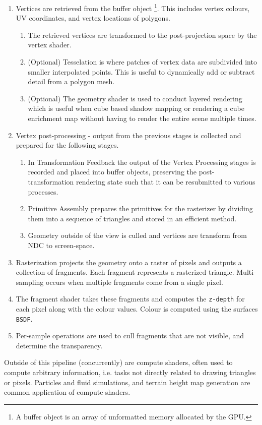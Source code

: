 \documentclass[11pt]{article}
\begin{document}
\begin{enumerate}
\item Vertices are retrieved from the buffer object \footnote{A buffer object is an array of unformatted memory allocated by the GPU.}. This includes vertex
colours, UV coordinates, and vertex locations of polygons.
\begin{enumerate}
\item The retrieved vertices are transformed to the post-projection space by the
vertex shader.
\item (Optional) Tesselation is where patches of vertex data are subdivided into
smaller interpolated points. This is useful to dynamically add or subtract
detail from a polygon mesh.
\item (Optional) The geometry shader is used to conduct layered rendering which is
useful when cube based shadow mapping or rendering a cube enrichment map
without having to render the entire scene multiple times.
\end{enumerate}
\item Vertex post-processing - output from the previous stages is collected
and prepared for the following stages.
\begin{enumerate}
\item In Transformation Feedback the output of the Vertex Processing stages is
recorded and placed into buffer objects, preserving the post-transformation
rendering state such that it can be resubmitted to various processes.
\item Primitive Assembly prepares the primitives for the rasterizer by dividing
them into a sequence of triangles and stored in an efficient method.
\item Geometry outside of the view is culled and vertices are transform from NDC
to screen-space.
\end{enumerate}
\item Rasterization projects the geometry onto a raster of pixels and outputs a
collection of fragments. Each fragment represents a rasterized triangle.
Multi-sampling occurs when multiple fragments come from a single pixel.
\item The fragment shader takes these fragments and computes the \texttt{z-depth} for
each pixel along with the colour values. Colour is computed using the
surfaces \texttt{BSDF}.
\item Per-sample operations are used to cull fragments that are not visible, and
determine the transparency.
\end{enumerate}
Outside of this pipeline (concurrently) are compute shaders, often
used to compute arbitrary information, i.e. tasks not directly related to drawing
triangles or pixels. Particles and fluid simulations, and terrain height map
generation are common application of compute shaders.
\end{document}
